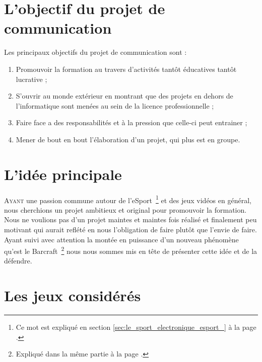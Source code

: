 \section{L'objectif du projet de communication}%
\label{sec:l_objectif_du_projet_de_communication}

Les principaux objectifs du projet de communication sont :

\begin{enumerate}

\item Promouvoir la formation au travers d'activités tantôt éducatives
tantôt lucrative ;

\item S'ouvrir au monde extérieur en montrant que des projets en dehors
de l'informatique sont menées au sein de la licence professionnelle ;

\item Faire face a des responsabilités et à la pression que celle-ci
peut entrainer ;

\item Mener de bout en bout l'élaboration d'un projet, qui plus est en
groupe.

\end{enumerate}

\section{L'idée principale}
\label{sec:l_idee_principale}

\lettrine{A}{yant} une passion commune autour de l'eSport\, \footnote{Ce
mot est expliqué en section \ref{sec:le_sport_electronique_esport_} à la
page \pageref{sec:le_sport_electronique_esport_}.} et des jeux vidéos en
général, nous cherchions un projet ambitieux et original pour promouvoir
la formation.  Nous ne voulions pas d'un projet maintes et maintes fois
réalisé et finalement peu motivant qui aurait reflété en nous
l'obligation de faire plutôt que l'envie de faire.  Ayant suivi avec
attention la montée en puissance d'un nouveau phénomène qu'est le
Barcraft\, \footnote{Expliqué dans la même partie à la page
\pageref{sec:barcraft}.} nous nous sommes mis en tête de présenter cette
idée et de la défendre.

\section{Les jeux considérés}%
\label{sec:les_jeux_consideres}

